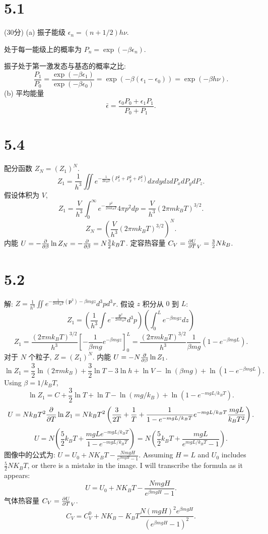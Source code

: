 \documentclass{article}
\begin{document}
\section*{5.1}
(30分) (a) 振子能级 $\epsilon_n = (n+1/2) h\nu$.

处于每一能级上的概率为 $P_n = \exp(-\beta \epsilon_n)$.

振子处于第一激发态与基态的概率之比:
\[ \frac{P_1}{P_0} = \frac{\exp(-\beta \epsilon_1)}{\exp(-\beta \epsilon_0)} = \exp(-\beta(\epsilon_1 - \epsilon_0)) = \exp(-\beta h\nu). \]
(b) 平均能量
\[ \bar{\epsilon} = \frac{\epsilon_0 P_0 + \epsilon_1 P_1}{P_0 + P_1}. \]

\section*{5.4}
配分函数 $Z_N = (Z_1)^N$.
\[ Z_1 = \frac{1}{h^3} \iint e^{-\frac{1}{2k_B T}(P_x^2+P_y^2+P_z^2)} dx dy dz dP_x dP_y dP_z. \]
假设体积为 $V$,
\[ Z_1 = \frac{V}{h^3} \int_0^\infty e^{-\frac{p^2}{2m k_B T}} 4\pi p^2 dp = \frac{V}{h^3} (2\pi m k_B T)^{3/2}. \]
\[ Z_N = \left(\frac{V}{h^3} (2\pi m k_B T)^{3/2}\right)^N. \]
内能 $U = -\pdv{}{\beta} \ln Z_N = -\pdv{}{\beta} (N \ln Z_1) = N \frac{3}{2} k_B T$.
定容热容量 $C_V = \pdv{U}{T}_V = \frac{3}{2} N k_B$.

\section*{5.2}
解: $Z = \frac{1}{h^3} \iint e^{-\frac{1}{2m k_B T}(\mathbf{p}^2) - \beta mgz} d^3p d^3r$.
假设 $z$ 积分从 $0$ 到 $L$:
\[ Z_1 = \left(\frac{1}{h^3} \int e^{-\frac{\mathbf{p}^2}{2m k_B T}} d^3p\right) \left(\int_0^L e^{-\beta mgz} dz\right) \]
\[ Z_1 = \frac{(2\pi m k_B T)^{3/2}}{h^3} \left[-\frac{1}{\beta mg} e^{-\beta mgz}\right]_0^L = \frac{(2\pi m k_B T)^{3/2}}{h^3} \frac{1}{\beta mg}(1 - e^{-\beta mgL}). \]
对于 $N$ 个粒子, $Z = (Z_1)^N$.
内能 $U = -N \pdv{}{\beta} \ln Z_1$.
\[ \ln Z_1 = \frac{3}{2} \ln(2\pi m k_B) + \frac{3}{2} \ln T - 3 \ln h + \ln V - \ln(\beta mg) + \ln(1 - e^{-\beta mgL}). \]
Using $\beta = 1/k_B T$,
\[ \ln Z_1 = C + \frac{3}{2} \ln T + \ln T - \ln(mg/k_B) + \ln(1 - e^{-mgL/k_B T}). \]
\[ U = N k_B T^2 \pdv{}{T} \ln Z_1 = N k_B T^2 \left( \frac{3}{2T} + \frac{1}{T} + \frac{1}{1 - e^{-mgL/k_B T}} e^{-mgL/k_B T} \frac{mgL}{k_B T^2} \right). \]
\[ U = N \left( \frac{5}{2} k_B T + \frac{mgL e^{-mgL/k_B T}}{1 - e^{-mgL/k_B T}} \right) = N \left( \frac{5}{2} k_B T + \frac{mgL}{e^{mgL/k_B T} - 1} \right). \]
图像中的公式为: $U = U_0 + NK_BT - \frac{NmgH}{e^{\beta mgH}-1}$. Assuming $H=L$ and $U_0$ includes $\frac{5}{2}NK_BT$, or there is a mistake in the image. I will transcribe the formula as it appears:
\[ U = U_0 + NK_BT - \frac{NmgH}{e^{\beta mgH}-1}. \]
气体热容量 $C_V = \pdv{U}{T}_V$.
\[ C_V = C_V^0 + NK_B - K_BT \frac{N(mgH)^2 e^{\beta mgH}}{(e^{\beta mgH}-1)^2}. \]
\end{document}
